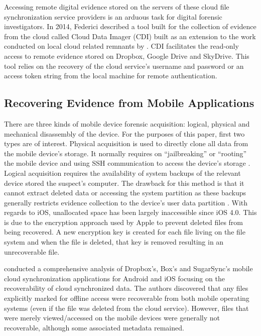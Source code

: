 \documentclass{jdfsl}
\begin{document}
Accessing remote digital evidence stored on the servers of these cloud file synchronization service providers is an arduous task for digital forensic investigators. In 2014, Federici described a tool built for the collection of evidence from the cloud called Cloud Data Imager (CDI) built as an extension to the work conducted on local cloud related remnants by \citet{Federici201430}. CDI facilitates the read-only access to remote evidence stored on Dropbox, Google Drive and SkyDrive. This tool relies on the recovery of the cloud service's username and password or an access token string from the local machine for remote authentication.

\subsection{Recovering Evidence from Mobile Applications}
\label{recovering}

There are three kinds of mobile device forensic acquisition: logical, physical and mechanical disassembly of the device. For the purposes of this paper, first two types are of interest. Physical acquisition is used to directly clone all data from the mobile device's storage. It normally requires on ``jailbreaking'' or ``rooting'' the mobile device and using SSH communication to access the device's storage \citep{zdziarski2008iphone}. Logical acquisition requires the availability of system backups of the relevant device stored the suspect's computer. The drawback for this method is that it cannot extract deleted data or accessing the system partition as these backups generally restricts evidence collection to the device's user data partition \citep{hoog2011iphone}. With regards to iOS, unallocated space has been largely inaccessible since iOS 4.0. This is due to the encryption approach used by Apple to prevent deleted files from being recovered. A new encryption key is created for each file living on the file system and when the file is deleted, that key is removed resulting in an unrecoverable file.

\citet{grispos2013smartphones} conducted a comprehensive analysis of Dropbox's, Box's and SugarSync's mobile cloud synchronization applications for Android and iOS focusing on the recoverability of cloud synchronized data. The authors discovered that any files explicitly marked for offline access were recoverable from both mobile operating systems (even if the file was deleted from the cloud service). However, files that were merely viewed/accessed on the mobile devices were generally not recoverable, although some associated metadata remained.\\
\end{document}
